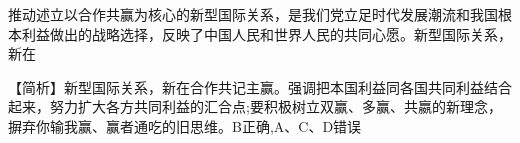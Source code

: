\question 推动述立以合作共赢为核心的新型国际关系，是我们党立足时代发展潮流和我国根本利益做出的战略选择，反映了中国人民和世界人民的共同心愿。新型国际关系，新在
\par{}
\begin{solution}【简析】新型国际关系，新在合作共记主赢。强调把本国利益同各国共同利益结合起来，努力扩大各方共同利益的汇合点;要积极树立双赢、多赢、共嬴的新理念，摒弃你输我赢、赢者通吃的旧思维。B正确,A、C、D错误
\end{solution}
